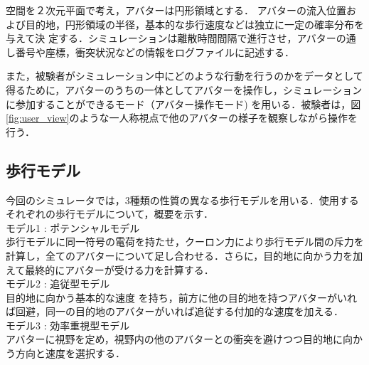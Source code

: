 \documentclass[twocolumn]{jarticle}%
\begin{document}
空間を２次元平面で考え，アバターは円形領域とする． アバターの流入位置および目的地，円形領域の半径，基本的な歩行速度などは独立に一定の確率分布を与えて決 定する．シミュレーションは離散時間間隔で進行させ，アバターの通し番号や座標，衝突状況などの情報をログファイルに記述する． 

また，被験者がシミュレーション中にどのような行動を行うのかをデータとして得るために，アバターのうちの一体としてアバターを操作し，シミュレーションに参加することができるモード（アバター操作モード) を用いる．被験者は，図\ref{fig:user_view}のような一人称視点で他のアバターの様子を観察しながら操作を行う．

\subsection{歩行モデル}
今回のシミュレータでは，3種類の性質の異なる歩行モデルを用いる．使用するそれぞれの歩行モデルについて，概要を示す．\\

モデル1 : ポテンシャルモデル\cite{Akuzawa}\\
歩行モデルに同一符号の電荷を持たせ，クーロン力により歩行モデル間の斥力を計算し，全てのアバターについて足し合わせる．さらに，目的地に向かう力を加えて最終的にアバターが受ける力を計算する． \\

モデル2 : 追従型モデル\cite{Sasagawa}\\
目的地に向かう基本的な速度 を持ち，前方に他の目的地を持つアバターがいれば回避，同一の目的地のアバターがいれば追従する付加的な速度を加える．\\

モデル3 : 効率重視型モデル\\
アバターに視野を定め，視野内の他のアバターとの衝突を避けつつ目的地に向かう方向と速度を選択する． \\
\end{document}
